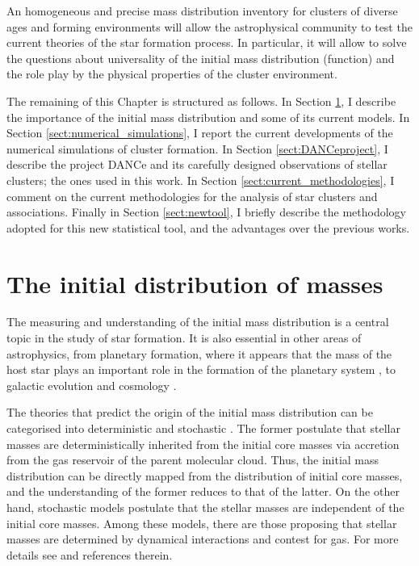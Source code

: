 An homogeneous and precise mass distribution inventory for clusters of diverse ages and forming environments will allow the astrophysical community to test the current theories of the star formation process. In particular, it will allow to solve the questions about universality of the initial mass distribution (function) and the role play by the physical properties of the cluster environment.    

The remaining of this Chapter is structured as follows. In Section \ref{sect:IMD}, I describe the importance of the initial mass distribution and some of its current models. In Section \ref{sect:numerical_simulations}, I report the current developments of the numerical simulations of cluster formation. In Section \ref{sect:DANCeproject}, I describe the project DANCe and its carefully designed observations of stellar clusters; the ones used in this work. In Section \ref{sect:current_methodologies}, I comment on the current methodologies for the analysis of star clusters and associations. Finally in Section \ref{sect:newtool}, I briefly describe the methodology adopted for this new statistical tool, and the advantages over the previous works. 

\section{The initial distribution of masses}
\label{sect:IMD}

The measuring and understanding of the initial mass distribution is a central topic in the study of star formation. It is also essential in other areas of astrophysics, from planetary formation, where it appears that the mass of the host star plays an important role in the formation of the planetary system \cite[see for example][]{2015ApJ...814..130M}, to galactic evolution \citep{1998ASPC..142....1K} and cosmology \cite[see for example][]{2012MNRAS.423.3601N}. 

The theories that predict the origin of the initial mass distribution can be categorised into deterministic and stochastic \citep{Offner2014}. The former postulate that stellar masses are deterministically inherited from the initial core masses via accretion from the gas reservoir of the parent molecular cloud. Thus, the initial mass distribution can be directly mapped from the distribution of initial core masses, and the understanding of the former reduces to that of the latter. On the other hand, stochastic models postulate that the stellar masses are independent of the initial core masses. Among these models, there are those proposing that stellar masses are determined by dynamical interactions and contest for gas. For more details see \citet{Offner2014} and references therein. 

